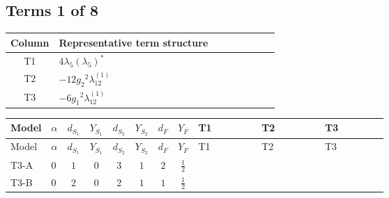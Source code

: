 \documentclass[8pt]{article}
\begin{document}
\begin{landscape}
\subsection*{Terms 1 of 8}
\begin{center}
\begin{tabular}{@{}c >{\raggedright\arraybackslash}p{0.82\linewidth}@{}}
\toprule
Column & Representative term structure \\
\midrule
T1 & \(\displaystyle 4 {\lambda_5} \left({\lambda_5}\right)^{*}\) \\
\midrule
T2 & \(\displaystyle -12 {g_2}^2 {\lambda_{12}^{(1)}}\) \\
\midrule
T3 & \(\displaystyle -6 {g_1}^2 {\lambda_{12}^{(1)}}\) \\
\midrule
\bottomrule
\end{tabular}
\end{center}
\smallskip
\tiny
\begin{longtable}{@{}llcccccc >{\raggedright\arraybackslash}p{0.21\linewidth} >{\raggedright\arraybackslash}p{0.21\linewidth} >{\raggedright\arraybackslash}p{0.21\linewidth}@{}}
\toprule
Model & $\alpha$ & $d_{S_1}$ & $Y_{S_1}$ & $d_{S_2}$ & $Y_{S_2}$ & $d_F$ & $Y_F$ & T1 & T2 & T3 \\
\midrule
\endfirsthead
\toprule
Model & $\alpha$ & $d_{S_1}$ & $Y_{S_1}$ & $d_{S_2}$ & $Y_{S_2}$ & $d_F$ & $Y_F$ & T1 & T2 & T3 \\
\midrule
\endhead
T3-A & $0$ & $1$ & $0$ & $3$ & $1$ & $2$ & $\frac{1}{2}$ & \scriptsize\adjustbox{max width=\linewidth}{$\begin{gathered} 4 {\lambda_5} \left({\lambda_5}\right)^{*}\end{gathered}$} & \scriptsize\adjustbox{max width=\linewidth}{$\begin{gathered} -12 {g_2}^2 {\lambda_{12}^{(1)}}\end{gathered}$} & \scriptsize\adjustbox{max width=\linewidth}{$\begin{gathered} -6 {g_1}^2 {\lambda_{12}^{(1)}}\end{gathered}$} \\
\midrule
T3-B & $0$ & $2$ & $0$ & $2$ & $1$ & $1$ & $\frac{1}{2}$ & \scriptsize\adjustbox{max width=\linewidth}{$\begin{gathered} 3 {\lambda_5} \left({\lambda_5}\right)^{*}\end{gathered}$} & \scriptsize\adjustbox{max width=\linewidth}{$\begin{gathered} -9 {g_2}^2 {\lambda_{12}^{(1)}}\end{gathered}$} & \scriptsize\adjustbox{max width=\linewidth}{$\begin{gathered} -6 {g_1}^2 {\lambda_{12}^{(1)}}\end{gathered}$} \\

\end{longtable}
\end{landscape}
\end{document}
